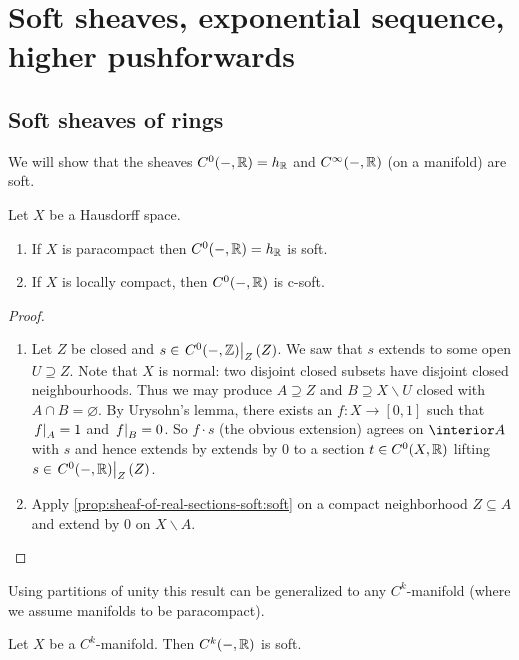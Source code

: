 \documentclass[../main.tex]{subfiles}
\begin{document}
\chapter{Soft sheaves, exponential sequence, higher pushforwards}
\label{lecture:14}

\section{Soft sheaves of rings}

We will show that the sheaves \(C^0(-,\mathbb{R})=h_{\mathbb{R}}\) and \(C^\infty(-,\mathbb{R})\) (on a manifold) are soft.

\begin{prop}
    Let $X$ be a Hausdorff space.
    \begin{enumerate}
        \item\label{prop:sheaf-of-real-sections-soft:soft} If $X$ is paracompact then $C^0(-, \mathbb{R}) = h_{\mathbb{R}}$ is soft.
        \item\label{prop:sheaf-of-real-sections-soft:c-soft} If $X$ is locally compact, then $C^0(-, \mathbb{R})$ is c-soft.
    \end{enumerate}
\end{prop}

\begin{proof}
    \begin{enumerate}
        \item Let $Z$ be closed and $s\in \left.C^0(-, \mathbb{Z})\right|_{Z}(Z)$. We saw that $s$ extends to some open $U\supseteq Z$. Note that $X$ is normal: two disjoint closed subsets have disjoint closed neighbourhoods. Thus we may produce $A\supseteq Z$ and $B\supseteq X\backslash U$ closed with $A\cap B = \varnothing$. By Urysohn's lemma, there exists an $f\colon X\to [0,1]$ such that $\left.f\right|_{A} = 1$ and $\left.f\right|_{B} = 0$. So $f\cdot s$ (the obvious extension) agrees on $\interior A$ with $s$ and hence extends by extends by $0$ to a section $t\in C^0(X, \mathbb{R})$ lifting $s\in \left.C^0(-, \mathbb{R})\right|_{Z}(Z)$. 
        \item Apply \cref{prop:sheaf-of-real-sections-soft:soft} on a compact neighborhood $Z\subseteq A$ and extend by $0$ on $X\backslash A$. \qedhere
    \end{enumerate}
\end{proof}

Using partitions of unity this result can be generalized to any $C^k$-manifold (where we assume manifolds to be paracompact).

\begin{prop}
    Let $X$ be a $C^k$-manifold. Then $C^k(-, \mathbb{R})$ is soft.
\end{prop}
\end{document}
